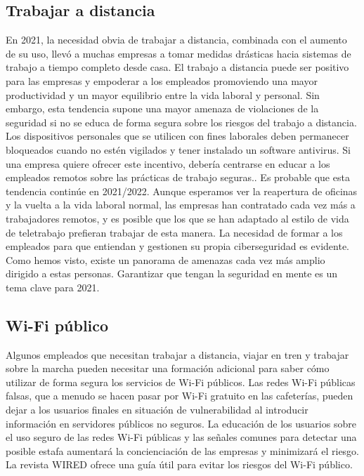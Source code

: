 \documentclass[
]{article}
\begin{document}
\hypertarget{trabajar-a-distancia}{%
\subsection{Trabajar a distancia}\label{trabajar-a-distancia}}

En 2021, la necesidad obvia de trabajar a distancia, combinada con el aumento de su uso, llevó a muchas empresas a tomar medidas drásticas hacia sistemas de trabajo a tiempo completo desde casa. El trabajo a distancia puede ser positivo para las empresas y empoderar a los empleados promoviendo una mayor productividad y un mayor equilibrio entre la vida laboral y personal. Sin embargo, esta tendencia supone una mayor amenaza de violaciones de la seguridad si no se educa de forma segura sobre los riesgos del trabajo a distancia. Los dispositivos personales que se utilicen con fines laborales deben permanecer bloqueados cuando no estén vigilados y tener instalado un software antivirus. Si una empresa quiere ofrecer este incentivo, debería centrarse en educar a los empleados remotos sobre las prácticas de trabajo seguras..
Es probable que esta tendencia continúe en 2021/2022. Aunque esperamos ver la reapertura de oficinas y la vuelta a la vida laboral normal, las empresas han contratado cada vez más a trabajadores remotos, y es posible que los que se han adaptado al estilo de vida de teletrabajo prefieran trabajar de esta manera. La necesidad de formar a los empleados para que entiendan y gestionen su propia ciberseguridad es evidente. Como hemos visto, existe un panorama de amenazas cada vez más amplio dirigido a estas personas. Garantizar que tengan la seguridad en mente es un tema clave para 2021.

\hypertarget{wi-fi-puxfablico}{%
\subsection{Wi-Fi público}\label{wi-fi-puxfablico}}

Algunos empleados que necesitan trabajar a distancia, viajar en tren y trabajar sobre la marcha pueden necesitar una formación adicional para saber cómo utilizar de forma segura los servicios de Wi-Fi públicos. Las redes Wi-Fi públicas falsas, que a menudo se hacen pasar por Wi-Fi gratuito en las cafeterías, pueden dejar a los usuarios finales en situación de vulnerabilidad al introducir información en servidores públicos no seguros.
La educación de los usuarios sobre el uso seguro de las redes Wi-Fi públicas y las señales comunes para detectar una posible estafa aumentará la concienciación de las empresas y minimizará el riesgo. La revista WIRED ofrece una guía útil para evitar los riesgos del Wi-Fi público.
\end{document}
